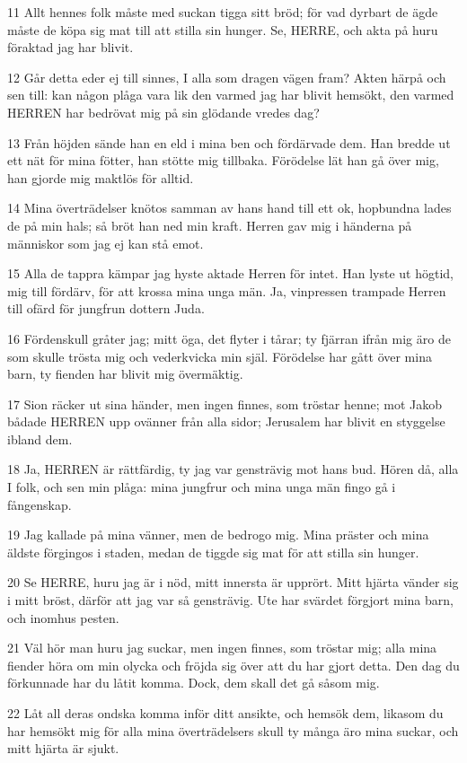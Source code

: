 \par 11 Allt hennes folk måste med suckan tigga sitt bröd; för vad dyrbart de ägde måste de köpa sig mat till att stilla sin hunger. Se, HERRE, och akta på huru föraktad jag har blivit.
\par 12 Går detta eder ej till sinnes, I alla som dragen vägen fram? Akten härpå och sen till: kan någon plåga vara lik den varmed jag har blivit hemsökt, den varmed HERREN har bedrövat mig på sin glödande vredes dag?
\par 13 Från höjden sände han en eld i mina ben och fördärvade dem. Han bredde ut ett nät för mina fötter, han stötte mig tillbaka. Förödelse lät han gå över mig, han gjorde mig maktlös för alltid.
\par 14 Mina överträdelser knötos samman av hans hand till ett ok, hopbundna lades de på min hals; så bröt han ned min kraft. Herren gav mig i händerna på människor som jag ej kan stå emot.
\par 15 Alla de tappra kämpar jag hyste aktade Herren för intet. Han lyste ut högtid, mig till fördärv, för att krossa mina unga män. Ja, vinpressen trampade Herren till ofärd för jungfrun dottern Juda.
\par 16 Fördenskull gråter jag; mitt öga, det flyter i tårar; ty fjärran ifrån mig äro de som skulle trösta mig och vederkvicka min själ. Förödelse har gått över mina barn, ty fienden har blivit mig övermäktig.
\par 17 Sion räcker ut sina händer, men ingen finnes, som tröstar henne; mot Jakob bådade HERREN upp ovänner från alla sidor; Jerusalem har blivit en styggelse ibland dem.
\par 18 Ja, HERREN är rättfärdig, ty jag var gensträvig mot hans bud. Hören då, alla I folk, och sen min plåga: mina jungfrur och mina unga män fingo gå i fångenskap.
\par 19 Jag kallade på mina vänner, men de bedrogo mig. Mina präster och mina äldste förgingos i staden, medan de tiggde sig mat för att stilla sin hunger.
\par 20 Se HERRE, huru jag är i nöd, mitt innersta är upprört. Mitt hjärta vänder sig i mitt bröst, därför att jag var så gensträvig. Ute har svärdet förgjort mina barn, och inomhus pesten.
\par 21 Väl hör man huru jag suckar, men ingen finnes, som tröstar mig; alla mina fiender höra om min olycka och fröjda sig över att du har gjort detta. Den dag du förkunnade har du låtit komma. Dock, dem skall det gå såsom mig.
\par 22 Låt all deras ondska komma inför ditt ansikte, och hemsök dem, likasom du har hemsökt mig för alla mina överträdelsers skull ty många äro mina suckar, och mitt hjärta är sjukt.

